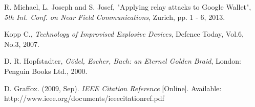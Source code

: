 \begin{thebibliography}{99}
\bibitem{[9]}
R. Michael, L. Joseph and S. Josef, "Applying relay attacks to Google Wallet", \emph{5th Int. Conf. on Near Field Communications}, Zurich, pp. 1 - 6, 2013.

\bibitem{[10]}
Kopp C., \emph{Technology of Improvised Explosive Devices}, Defence Today, Vol.6, No.3, 2007.

\bibitem{[11]}
D. R. Hopfstadter, \emph{G\"{o}del, Escher, Bach: an Eternel Golden Braid}, London: Penguin Books Ltd., 2000.

\bibitem{[20]}
D. Graffox. (2009, Sep). \emph{IEEE Citation Reference} [Online]. Available: http://www.ieee.org/documents/ieeecitationref.pdf 

\end{thebibliography}